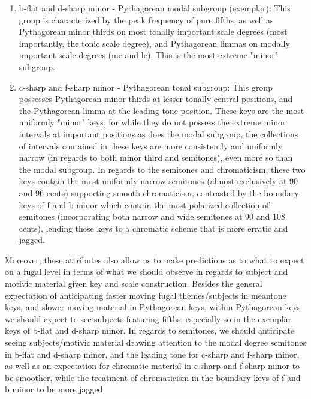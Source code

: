 \begin{enumerate}
  \begin{enumerate}
  \def\labelenumii{\arabic{enumii}.}
  \tightlist
  \item
    b-flat and d-sharp minor - Pythagorean modal subgroup (exemplar):
    This group is characterized by the peak frequency of pure fifths, as
    well as Pythagorean minor thirds on most tonally important scale
    degrees (most importantly, the tonic scale degree), and Pythagorean
    limmas on modally important scale degrees (me and le). This is the
    most extreme "minor" subgroup.
  \item
    c-sharp and f-sharp minor - Pythagorean tonal subgroup: This group
    possesses Pythagorean minor thirds at lesser tonally central
    positions, and the Pythagorean limma at the leading tone position.
    These keys are the most uniformly "minor" keys, for while they do
    not possess the extreme minor intervals at important positions as
    does the modal subgroup, the collections of intervals contained in
    these keys are more consistently and uniformly narrow (in regards to
    both minor third and semitones), even more so than the modal
    subgroup. In regards to the semitones and chromaticism, these two
    keys contain the most uniformly narrow semitones (almost exclusively
    at 90 and 96 cents) supporting smooth chromaticism, contrasted by
    the boundary keys of f and b minor which contain the most polarized
    collection of semitones (incorporating both narrow and wide
    semitones at 90 and 108 cents), lending these keys to a chromatic
    scheme that is more erratic and jagged.
  \end{enumerate}
\end{enumerate}

Moreover, these attributes also allow us to make predictions as to what
to expect on a fugal level in terms of what we should observe in regards
to subject and motivic material given key and scale construction.
Besides the general expectation of anticipating faster moving fugal
themes/subjects in meantone keys, and slower moving material in
Pythagorean keys, within Pythagorean keys we should expect to see
subjects featuring fifths, especially so in the exemplar keys of b-flat
and d-sharp minor. In regards to semitones, we should anticipate seeing
subjects/motivic material drawing attention to the modal degree
semitones in b-flat and d-sharp minor, and the leading tone for c-sharp
and f-sharp minor, as well as an expectation for chromatic material in
c-sharp and f-sharp minor to be smoother, while the treatment of
chromaticism in the boundary keys of f and b minor to be more jagged.

